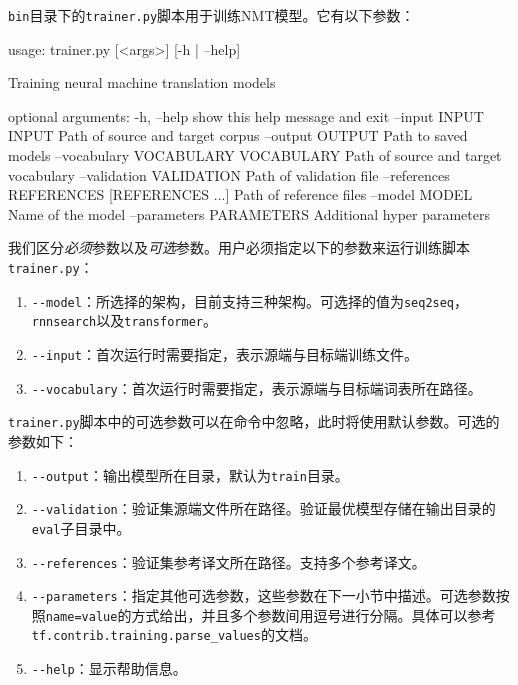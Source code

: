 \documentclass{article}
\begin{document}
\verb|bin|目录下的\verb|trainer.py|脚本用于训练NMT模型。它有以下参数：
\begin{everbatim}
usage: trainer.py [<args>] [-h | --help]

Training neural machine translation models

optional arguments:
  -h, --help            show this help message and exit
  --input INPUT INPUT   Path of source and target corpus
  --output OUTPUT       Path to saved models
  --vocabulary VOCABULARY VOCABULARY
                        Path of source and target vocabulary
  --validation VALIDATION
                        Path of validation file
  --references REFERENCES [REFERENCES ...]
                        Path of reference files
  --model MODEL         Name of the model
  --parameters PARAMETERS
                        Additional hyper parameters
\end{everbatim}

我们区分\textit{必须}参数以及\textit{可选}参数。用户必须指定以下的参数来运行训练脚本\verb|trainer.py|：
\begin{enumerate}
\item \verb|--model|：所选择的架构，目前支持三种架构。可选择的值为\verb|seq2seq|，\verb|rnnsearch|以及\verb|transformer|。
\item \verb|--input|：首次运行时需要指定，表示源端与目标端训练文件。
\item \verb|--vocabulary|：首次运行时需要指定，表示源端与目标端词表所在路径。
\end{enumerate}

\verb|trainer.py|脚本中的可选参数可以在命令中忽略，此时将使用默认参数。可选的参数如下：
\begin{enumerate}
\item \verb|--output|：输出模型所在目录，默认为\verb|train|目录。
\item \verb|--validation|：验证集源端文件所在路径。验证最优模型存储在输出目录的\verb|eval|子目录中。
\item \verb|--references|：验证集参考译文所在路径。支持多个参考译文。
\item \verb|--parameters|：指定其他可选参数，这些参数在下一小节中描述。可选参数按照\verb|name=value|的方式给出，并且多个参数间用逗号进行分隔。具体可以参考\verb|tf.contrib.training.parse_values|的文档。
\item \verb|--help|：显示帮助信息。
\end{enumerate}
\end{document}
